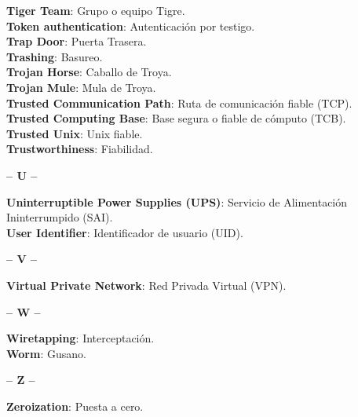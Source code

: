 {\bf Tiger Team}: Grupo o equipo Tigre.\\
{\bf Token authentication}: Autenticaci\'on por testigo.\\
{\bf Trap Door}: Puerta Trasera.\\
{\bf Trashing}: Basureo.\\
{\bf Trojan Horse}: Caballo de Troya.\\
{\bf Trojan Mule}: Mula de Troya.\\
{\bf Trusted Communication Path}: Ruta de comunicaci\'on fiable (TCP).\\
{\bf Trusted Computing Base}: Base segura o fiable de c\'omputo (TCB).\\
{\bf Trusted Unix}: Unix fiable.\\
{\bf Trustworthiness}: Fiabilidad.\\
\begin{center}
{\large {\bf -- U --}}\\
\end{center}
{\bf Uninterruptible Power Supplies (UPS)}: Servicio de Alimentaci\'on Ininterrumpido (SAI).\\
{\bf User Identifier}: Identificador de usuario (UID).\\
\begin{center}
{\large {\bf -- V --}}\\
\end{center}
{\bf Virtual Private Network}: Red Privada Virtual (VPN).\\
\begin{center}
{\large {\bf -- W --}}\\
\end{center}
{\bf Wiretapping}: Interceptaci\'on.\\
{\bf Worm}: Gusano.\\
\begin{center}
{\large {\bf -- Z --}}\\
\end{center}
{\bf Zeroization}: Puesta a cero.\\
